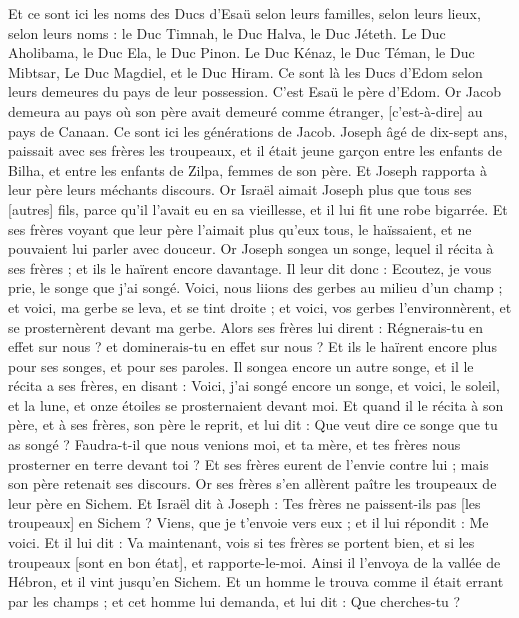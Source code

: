 \begin{multicols}{2}
Et ce sont ici les noms des Ducs d'Esaü selon leurs familles, selon leurs lieux, selon leurs noms : le Duc Timnah, le Duc Halva, le Duc Jéteth.
Le Duc Aholibama, le Duc Ela, le Duc Pinon.
Le Duc Kénaz, le Duc Téman, le Duc Mibtsar,
Le Duc Magdiel, et le Duc Hiram. Ce sont là les Ducs d'Edom selon leurs demeures du pays de leur possession. C'est Esaü le père d'Edom.
\VerseOne{}Or Jacob demeura au pays où son père avait demeuré comme étranger, [c'est-à-dire] au pays de Canaan.
Ce sont ici les générations de Jacob. Joseph âgé de dix-sept ans, paissait avec ses frères les troupeaux, et il était jeune garçon entre les enfants de Bilha, et entre les enfants de Zilpa, femmes de son père. Et Joseph rapporta à leur père leurs méchants discours.
Or Israël aimait Joseph plus que tous ses [autres] fils, parce qu'il l'avait eu en sa vieillesse, et il lui fit une robe bigarrée.
Et ses frères voyant que leur père l'aimait plus qu'eux tous, le haïssaient, et ne pouvaient lui parler avec douceur.
Or Joseph songea un songe, lequel il récita à ses frères ; et ils le haïrent encore davantage.
Il leur dit donc : Ecoutez, je vous prie, le songe que j'ai songé.
Voici, nous liions des gerbes au milieu d'un champ ; et voici, ma gerbe se leva, et se tint droite ; et voici, vos gerbes l'environnèrent, et se prosternèrent devant ma gerbe.
Alors ses frères lui dirent : Régnerais-tu en effet sur nous ? et dominerais-tu en effet sur nous ? Et ils le haïrent encore plus pour ses songes, et pour ses paroles.
Il songea encore un autre songe, et il le récita a ses frères, en disant : Voici, j'ai songé encore un songe, et voici, le soleil, et la lune, et onze étoiles se prosternaient devant moi.
Et quand il le récita à son père, et à ses frères, son père le reprit, et lui dit : Que veut dire ce songe que tu as songé ? Faudra-t-il que nous venions moi, et ta mère, et tes frères nous prosterner en terre devant toi ?
Et ses frères eurent de l'envie contre lui ; mais son père retenait ses discours.
Or ses frères s'en allèrent paître les troupeaux de leur père en Sichem.
Et Israël dit à Joseph : Tes frères ne paissent-ils pas [les troupeaux] en Sichem ? Viens, que je t'envoie vers eux ; et il lui répondit : Me voici.
Et il lui dit : Va maintenant, vois si tes frères se portent bien, et si les troupeaux [sont en bon état], et rapporte-le-moi. Ainsi il l'envoya de la vallée de Hébron, et il vint jusqu'en Sichem.
Et un homme le trouva comme il était errant par les champs ; et cet homme lui demanda, et lui dit : Que cherches-tu ?

\end{multicols}
